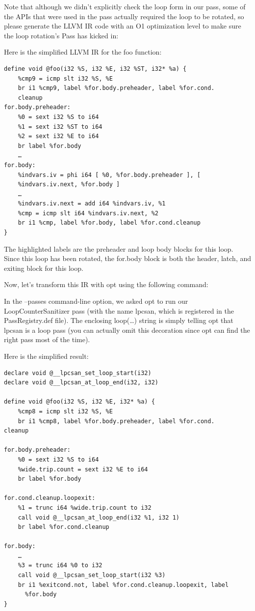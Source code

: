 Note that although we didn't explicitly check the loop form in our pass, some of the APIs that were used in the pass actually required the loop to be rotated, so please generate the LLVM IR code with an O1 optimization level to make sure the loop rotation's Pass has kicked in:

Here is the simplified LLVM IR for the foo function:

\begin{lstlisting}[style=styleCXX]
define void @foo(i32 %S, i32 %E, i32 %ST, i32* %a) {
	%cmp9 = icmp slt i32 %S, %E
	br i1 %cmp9, label %for.body.preheader, label %for.cond.
	cleanup
for.body.preheader:
	%0 = sext i32 %S to i64
	%1 = sext i32 %ST to i64
	%2 = sext i32 %E to i64
	br label %for.body
	…
for.body:
	%indvars.iv = phi i64 [ %0, %for.body.preheader ], [
	%indvars.iv.next, %for.body ]
	…
	%indvars.iv.next = add i64 %indvars.iv, %1
	%cmp = icmp slt i64 %indvars.iv.next, %2
	br i1 %cmp, label %for.body, label %for.cond.cleanup
}
\end{lstlisting}

The highlighted labels are the preheader and loop body blocks for this loop. Since this loop has been rotated, the for.body block is both the header, latch, and exiting block for this loop.

Now, let's transform this IR with opt using the following command:


In the –passes command-line option, we asked opt to run our LoopCounterSanitizer pass (with the name lpcsan, which is registered in the PassRegistry.def file). The enclosing loop(…) string is simply telling opt that lpcsan is a loop pass (you can actually omit this decoration since opt can find the right pass most of the time).

Here is the simplified result:

\begin{lstlisting}[style=styleCXX]
declare void @__lpcsan_set_loop_start(i32)
declare void @__lpcsan_at_loop_end(i32, i32)

define void @foo(i32 %S, i32 %E, i32* %a) {
	%cmp8 = icmp slt i32 %S, %E
	br i1 %cmp8, label %for.body.preheader, label %for.cond.
cleanup
	
for.body.preheader:
	%0 = sext i32 %S to i64
	%wide.trip.count = sext i32 %E to i64
	br label %for.body
	
for.cond.cleanup.loopexit:
	%1 = trunc i64 %wide.trip.count to i32
	call void @__lpcsan_at_loop_end(i32 %1, i32 1)
	br label %for.cond.cleanup
	
for.body:
	…
	%3 = trunc i64 %0 to i32
	call void @__lpcsan_set_loop_start(i32 %3)
	br i1 %exitcond.not, label %for.cond.cleanup.loopexit, label
	  %for.body
}
\end{lstlisting}

